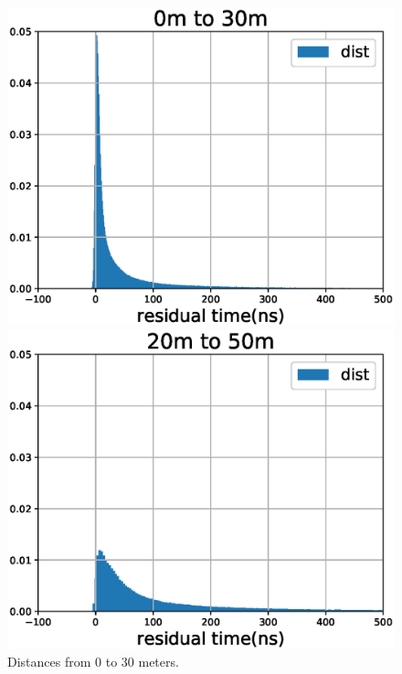 \begin{figure}[H]
  \begin{minipage}[b]{0.48\linewidth}
    \centering
    \includegraphics[width=\textwidth]{./Figures/reco_plots/residual_time_hist_r1.eps}
    \caption{Distances from 0 to 30 meters.}
    \label{subfig:res_time_r1}
  \end{minipage}
  \hspace{0.1cm}
  \begin{minipage}[b]{0.48\linewidth}
    \centering
    \includegraphics[width=\textwidth]{./Figures/reco_plots/residual_time_hist_r3.eps}

\end{minipage}
\end{figure}

